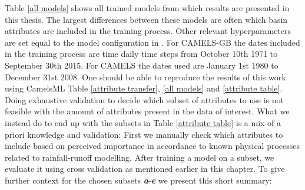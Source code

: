 Table \ref{all models} shows all trained models from which results are presented in this 
thesis. The largest differences between these models are often which basin attributes 
are included in the training process. Other relevant hyperparameters are set equal 
to the model configuration in \citet{lstm_second_paper}. For CAMELS-GB the dates included 
in the training process are time daily time steps from October 10th 1971 to September 
30th 2015.
For CAMELS the dates used are January 1st 1980 to December 31st 2008.
One should be able to reproduce the results 
of this work using CamelsML Table \ref{attribute transfer}, \ref{all models} and \ref{attribute table}. 
Doing exhaustive validation to decide which subset of attributes to use is not 
feasible with the amount of attributes present in the data of interest. What we instead 
do to end up with the subsets in Table \ref{attribute table} is a mix of a priori 
knowledge and validation: First we manually check which attributes to include based 
on perceived importance in accordance to known physical processes related to rainfall-runoff 
modelling. After training a model on a subset, we evaluate it using cross validation 
as mentioned earlier in this chapter. To give further context for the chosen subsets 
\textbf{\textit{a}}-\textbf{\textit{e}} we present this short summary:
